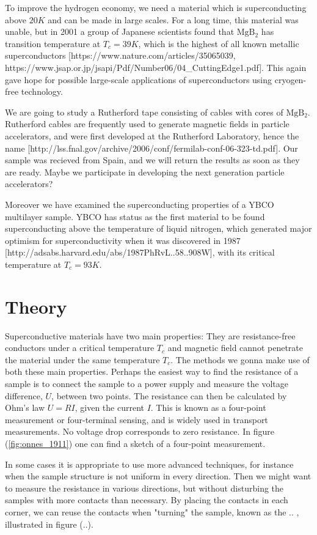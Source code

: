 \documentclass{comjnl}
\newcommand*\chem[1]{\ensuremath{\mathrm{#1}}}
\begin{document}
To improve the hydrogen economy, we need a material which is superconducting above $20K$ and can be made in large scales. For a long time, this material was unable, but in 2001 a group of Japanese scientists found that \chem{MgB_2} has transition temperature at $T_c=39K$, which is the highest of all known metallic superconductors [https://www.nature.com/articles/35065039, https://www.jsap.or.jp/jsapi/Pdf/Number06/04_CuttingEdge1.pdf]. This again gave hope for possible large-scale applications of superconductors using cryogen-free technology. 

We are going to study a Rutherford tape consisting of cables with cores of \chem{MgB_2}. Rutherford cables are frequently used to generate magnetic fields in particle accelerators, and were first developed at the Rutherford Laboratory, hence the name [http://lss.fnal.gov/archive/2006/conf/fermilab-conf-06-323-td.pdf]. Our sample was recieved from Spain, and we will return the results as soon as they are ready. Maybe we participate in developing the next generation particle accelerators?

Moreover we have examined the superconducting properties of a YBCO multilayer sample. YBCO has status as the first material to be found superconducting above the temperature of liquid nitrogen, which generated major optimism for superconductivity when it was discovered in 1987 [http://adsabs.harvard.edu/abs/1987PhRvL..58..908W], with its critical temperature at $T_c=93K$. 

\section{Theory}\label{Sec:Theory}
Superconductive materials have two main properties: They are resistance-free conductors under a critical temperature $T_c$ and magnetic field cannot penetrate the material under the same temperature $T_c$. The methods we gonna make use of both these main properties. Perhaps the easiest way to find the resistance of a sample is to connect the sample to a power supply and measure the voltage difference, $U$, between two points. The resistance can then be calculated by Ohm's law $U=RI$, given the current $I$. This is known as a four-point measurement or four-terminal sensing, and is widely used in transport measurements. No voltage drop corresponds to zero resistance. In figure (\ref{fig:onnes_1911}) one can find a sketch of a four-point measurement. 

In some cases it is appropriate to use more advanced techniques, for instance when the sample structure is not uniform in every direction. Then we might want to measure the resistance in various directions, but without disturbing the samples with more contacts than necessary. By placing the contacts in each corner, we can reuse the contacts when "turning" the sample, known as the .. , illustrated in figure (..). 
\end{document}
